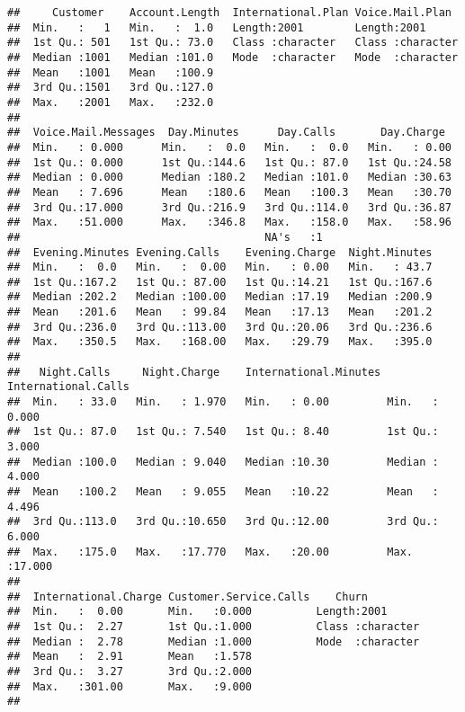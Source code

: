 \documentclass[]{article}
\begin{document}
\begin{verbatim}
##     Customer    Account.Length  International.Plan Voice.Mail.Plan   
##  Min.   :   1   Min.   :  1.0   Length:2001        Length:2001       
##  1st Qu.: 501   1st Qu.: 73.0   Class :character   Class :character  
##  Median :1001   Median :101.0   Mode  :character   Mode  :character  
##  Mean   :1001   Mean   :100.9                                        
##  3rd Qu.:1501   3rd Qu.:127.0                                        
##  Max.   :2001   Max.   :232.0                                        
##                                                                      
##  Voice.Mail.Messages  Day.Minutes      Day.Calls       Day.Charge   
##  Min.   : 0.000      Min.   :  0.0   Min.   :  0.0   Min.   : 0.00  
##  1st Qu.: 0.000      1st Qu.:144.6   1st Qu.: 87.0   1st Qu.:24.58  
##  Median : 0.000      Median :180.2   Median :101.0   Median :30.63  
##  Mean   : 7.696      Mean   :180.6   Mean   :100.3   Mean   :30.70  
##  3rd Qu.:17.000      3rd Qu.:216.9   3rd Qu.:114.0   3rd Qu.:36.87  
##  Max.   :51.000      Max.   :346.8   Max.   :158.0   Max.   :58.96  
##                                      NA's   :1                      
##  Evening.Minutes Evening.Calls    Evening.Charge  Night.Minutes  
##  Min.   :  0.0   Min.   :  0.00   Min.   : 0.00   Min.   : 43.7  
##  1st Qu.:167.2   1st Qu.: 87.00   1st Qu.:14.21   1st Qu.:167.6  
##  Median :202.2   Median :100.00   Median :17.19   Median :200.9  
##  Mean   :201.6   Mean   : 99.84   Mean   :17.13   Mean   :201.2  
##  3rd Qu.:236.0   3rd Qu.:113.00   3rd Qu.:20.06   3rd Qu.:236.6  
##  Max.   :350.5   Max.   :168.00   Max.   :29.79   Max.   :395.0  
##                                                                  
##   Night.Calls     Night.Charge    International.Minutes International.Calls
##  Min.   : 33.0   Min.   : 1.970   Min.   : 0.00         Min.   : 0.000     
##  1st Qu.: 87.0   1st Qu.: 7.540   1st Qu.: 8.40         1st Qu.: 3.000     
##  Median :100.0   Median : 9.040   Median :10.30         Median : 4.000     
##  Mean   :100.2   Mean   : 9.055   Mean   :10.22         Mean   : 4.496     
##  3rd Qu.:113.0   3rd Qu.:10.650   3rd Qu.:12.00         3rd Qu.: 6.000     
##  Max.   :175.0   Max.   :17.770   Max.   :20.00         Max.   :17.000     
##                                                                            
##  International.Charge Customer.Service.Calls    Churn          
##  Min.   :  0.00       Min.   :0.000          Length:2001       
##  1st Qu.:  2.27       1st Qu.:1.000          Class :character  
##  Median :  2.78       Median :1.000          Mode  :character  
##  Mean   :  2.91       Mean   :1.578                            
##  3rd Qu.:  3.27       3rd Qu.:2.000                            
##  Max.   :301.00       Max.   :9.000                            
## 
\end{verbatim}
\end{document}
